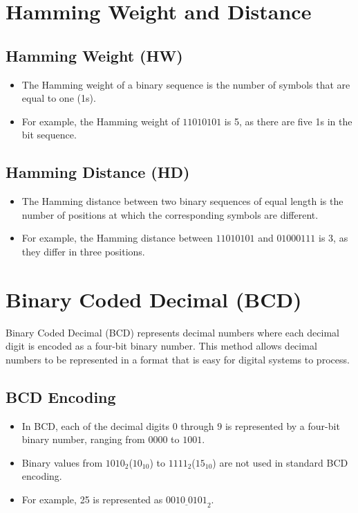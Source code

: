\documentclass[12pt,openany]{book}
\begin{document}
	
	\section{Hamming Weight and Distance}
	
	
	\subsection{Hamming Weight (HW)}
	\begin{itemize}
		\item[] The Hamming weight of a binary sequence is the number of symbols that are equal to one (1s).
		\item[] For example, the Hamming weight of \( 11010101 \) is 5, as there are five 1s in the bit sequence.
	\end{itemize}
	
	\subsection{Hamming Distance (HD)}
	\begin{itemize}
		\item[] The Hamming distance between two binary sequences of equal length is the number of positions at which the corresponding symbols are different.
		\item[] For example, the Hamming distance between \( 11010101 \) and \( 01000111 \) is 3, as they differ in three positions.
	\end{itemize}
	
	
	\section{Binary Coded Decimal (BCD)}
	
	Binary Coded Decimal (BCD) represents decimal numbers where each decimal digit is encoded as a four-bit binary number. This method allows decimal numbers to be represented in a format that is easy for digital systems to process.
	
	\subsection{BCD Encoding}
	
	\begin{itemize}
		\item In BCD, each of the decimal digits \(0\) through \(9\) is represented by a four-bit binary number, ranging from \(0000\) to \(1001\).
		\item Binary values from \(1010_2\)($10_{10}$) to \(1111_{2}\)($15_{10}$) are not used in standard BCD encoding.
		\item For example, 25 is represented as \(\underline{{0010 \; 0101}}_{2}\).
	\end{itemize}
	
\end{document}
